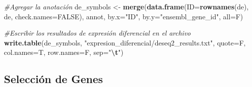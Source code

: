 \documentclass[
]{article}
\newenvironment{Shaded}{\begin{snugshade}}{\end{snugshade}}
\newcommand{\AttributeTok}[1]{\textcolor[rgb]{0.13,0.29,0.53}{#1}}
\newcommand{\CommentTok}[1]{\textcolor[rgb]{0.56,0.35,0.01}{\textit{#1}}}
\newcommand{\ConstantTok}[1]{\textcolor[rgb]{0.56,0.35,0.01}{#1}}
\newcommand{\DecValTok}[1]{\textcolor[rgb]{0.00,0.00,0.81}{#1}}
\newcommand{\FloatTok}[1]{\textcolor[rgb]{0.00,0.00,0.81}{#1}}
\newcommand{\FunctionTok}[1]{\textcolor[rgb]{0.13,0.29,0.53}{\textbf{#1}}}
\newcommand{\NormalTok}[1]{#1}
\newcommand{\OtherTok}[1]{\textcolor[rgb]{0.56,0.35,0.01}{#1}}
\newcommand{\SpecialCharTok}[1]{\textcolor[rgb]{0.81,0.36,0.00}{\textbf{#1}}}
\newcommand{\StringTok}[1]{\textcolor[rgb]{0.31,0.60,0.02}{#1}}
\begin{document}
\begin{Shaded}
\begin{Highlighting}[]
\CommentTok{\#Agregar la anotación}
\NormalTok{de\_symbols }\OtherTok{\textless{}{-}} \FunctionTok{merge}\NormalTok{(}\FunctionTok{data.frame}\NormalTok{(}\AttributeTok{ID=}\FunctionTok{rownames}\NormalTok{(de), de, }\AttributeTok{check.names=}\ConstantTok{FALSE}\NormalTok{), annot, }\AttributeTok{by.x=}\StringTok{"ID"}\NormalTok{, }\AttributeTok{by.y=}\StringTok{"ensembl\_gene\_id"}\NormalTok{, }\AttributeTok{all=}\NormalTok{F)}

\CommentTok{\#Escribir los resultados de expresión diferencial en el archivo}
\FunctionTok{write.table}\NormalTok{(de\_symbols, }\StringTok{"expresion\_diferencial/deseq2\_results.txt"}\NormalTok{, }\AttributeTok{quote=}\NormalTok{F, }\AttributeTok{col.names=}\NormalTok{T, }\AttributeTok{row.names=}\NormalTok{F, }\AttributeTok{sep=}\StringTok{"}\SpecialCharTok{\textbackslash{}t}\StringTok{"}\NormalTok{)}
\end{Highlighting}
\end{Shaded}

\subsection{Selección de Genes}\label{selecciuxf3n-de-genes}

\begin{Shaded}
\end{Shaded}
\end{document}
